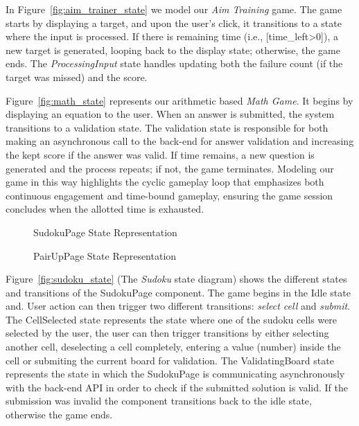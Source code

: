 \documentclass[11pt,a4paper]{article}
\newcommand{\inputdiagram}[1]{}
\newcommand{\textwidthdiagram}[2][1]{%
  \resizebox{#1\textwidth}{!}{\inputdiagram{#2}}%
}
\begin{document}
In Figure~\ref{fig:aim_trainer_state} we model our \textit{Aim Training} game. The
game starts by displaying a target, and upon the user's click, it transitions
to a state where the input is processed. If there is remaining time (i.e.,
[time\_left>0]), a new target is generated, looping back to the display state;
otherwise, the game ends. The \textit{ProcessingInput} state handles updating both
the failure count (if the target was missed) and the score.

Figure~\ref{fig:math_state} represents our arithmetic based \textit{Math Game}. It
begins by displaying an equation to the user. When an answer is submitted, the
system transitions to a validation state. The validation state is responsible
for both making an asynchronous call to the back-end for answer validation
and increasing the kept score if the answer was valid. If time remains,
a new question is generated and the process repeats; if not, the game
terminates. Modeling our game in this way highlights the cyclic gameplay
loop that emphasizes both continuous engagement and time-bound gameplay,
ensuring the game session concludes when the allotted time is exhausted.

\begin{figure}[H]
    \centering
    \begin{minipage}[b]{0.48\textwidth}
        \centering
        \textwidthdiagram{sudoku_state.tex}
        \caption{SudokuPage State Representation}
        \label{fig:sudoku_state}
    \end{minipage}
    \hfil
    \begin{minipage}[b]{0.48\textwidth}
        \centering
        \textwidthdiagram{pair_up_state.tex}
        \caption{PairUpPage State Representation}
        \label{fig:pair_up_state}
    \end{minipage}
\end{figure}

Figure~\ref{fig:sudoku_state} (The \textit{Sudoku} state diagram) shows the different states and transitions of the SudokuPage component. The game begins in the Idle state and. User action can then trigger two different transitions: \textit{select cell} and \textit{submit}. The CellSelected state represents the state where one of the sudoku cells were selected by the user, the user can then trigger transitions by either selecting another cell, deselecting a cell completely, entering a value (number) inside the cell or submiting the current board for validation. The ValidatingBoard state represents the state in which the SudokuPage is communicating asynchronously with the back-end API in order to check if the submitted solution is valid. If the submission was invalid the component transitions back to the idle state, otherwise the game ends.
\end{document}
